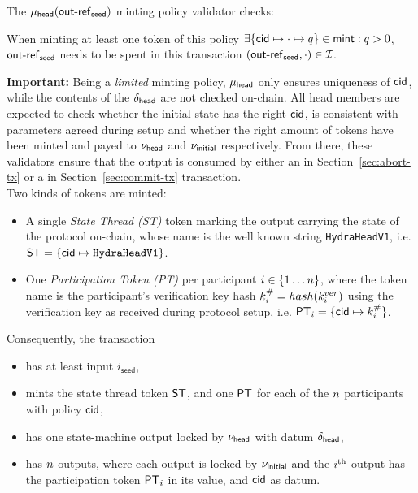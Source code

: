 \noindent The $\mu_\mathsf{head}(\mathsf{out\textsf{-}{}ref}_{\mathsf{seed}})$ minting policy validator checks:
\begin{menumerate}
  \item When minting at least one token of this policy
  $\exists \{\mathsf{cid} \mapsto \cdot \mapsto q\} \in \mathsf{mint} : q > 0$, \\
  $\mathsf{out\textsf{-}{}ref}_{\mathsf{seed}}$ needs to be spent in this transaction $(\mathsf{out\textsf{-}{}ref}_{\mathsf{seed}}, \cdot) \in \mathcal{I}$.
\end{menumerate}

\noindent \textbf{Important:} Being a \emph{limited} minting policy, $\mu_\mathsf{head}$ only ensures
uniqueness of $\mathsf{cid}$, while the contents of the $\delta_{\mathsf{head}}$ are not
checked on-chain. All head members are expected to check whether the initial
state has the right $\mathsf{cid}$, is consistent with parameters agreed during setup
and whether the right amount of tokens have been minted and payed to $\nu_\mathsf{head}$
and $\nu_{\mathsf{initial}}$ respectively. From there, these validators ensure that the
output is consumed by either an \mtxAbort{} in Section~\ref{sec:abort-tx} or a
\mtxCom{} in Section~\ref{sec:commit-tx} transaction. \\

\noindent Two kinds of tokens are minted:
\begin{itemize}
  \item A single \emph{State Thread (ST)} token marking the output carrying the state
        of the protocol on-chain, whose name is the well known string
        \texttt{HydraHeadV1}, i.e.
        $\mathsf{ST} = \{\mathsf{cid} \mapsto \texttt{HydraHeadV1}\}$.
  \item One \emph{Participation Token (PT)} per participant
        $i \in \{1 \dots n \}$, where the token name is the participant's
        verification key hash $k^{\#}_{i} = hash(k^{ver}_{i})$ using the
        verification key as received during protocol setup, i.e.
        $\mathsf{PT}_{i} = \{\mathsf{cid} \mapsto k^{\#}_{i}\}$.
\end{itemize}

\noindent Consequently, the \mtxInit{} transaction

\begin{itemize}
  \item has at least input $i_{\mathsf{seed}}$,
  \item mints the state thread token $\mathsf{ST}$, and one $\mathsf{PT}$ for each of the $n$
        participants with policy $\mathsf{cid}$,
  \item has one state-machine output locked by $\nu_\mathsf{head}$ with datum
        $\delta_{\mathsf{head}}$,
  \item has $n$ outputs, where each output is locked by $\nu_{\mathsf{initial}}$ and the
        $i^{\text{th}}$ output has the participation token $\mathsf{PT}_i$ in its value, and
        $\mathsf{cid}$ as datum.
\end{itemize}

